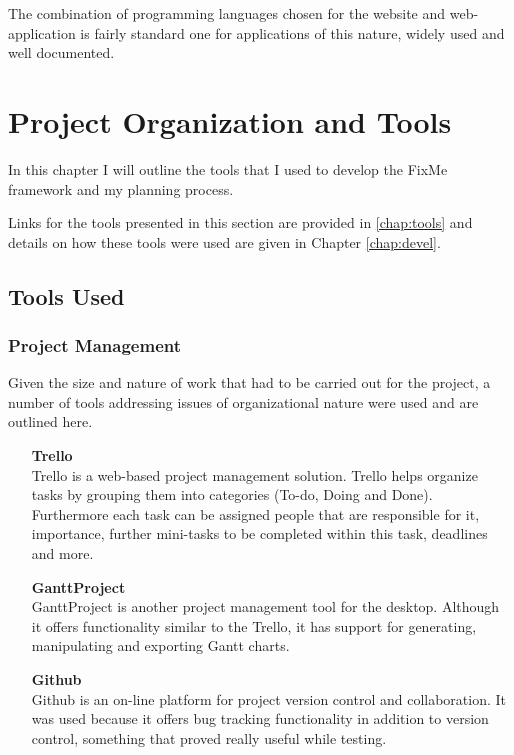 \documentclass[12pt]{ecsproject}     %
\begin{document}
The combination of programming languages chosen for the website and web-application is fairly standard one for applications of this nature, widely used and well documented.\\

\chapter{Project Organization and Tools}
\label{chap:projtools}
In this chapter I will outline the tools that I used to develop the FixMe framework and my planning process.

Links for the tools presented in this section are provided in \ref{chap:tools} and details on how these tools were used are given in Chapter \ref{chap:devel}.

\section{Tools Used}
\subsection{Project Management}
\label{sub:pm}
Given the size and nature of work that had to be carried out for the project, a number of tools addressing issues of organizational nature were used and are outlined here.

\begin{itemize}
\item[\textbf{Trello}] \hfill \\
Trello is a web-based project management solution. Trello helps organize tasks by grouping them into categories (To-do, Doing and Done). Furthermore each task can be assigned people that are responsible for it, importance, further mini-tasks to be completed within this task, deadlines and more.
\item[\textbf{GanttProject}]\hfill \\
GanttProject is another project management tool for the desktop. Although it offers functionality similar to the Trello, it has support for generating, manipulating and exporting Gantt charts.
\item[\textbf{Github}]\hfill \\
Github is an on-line platform for project version control and  collaboration. It was used because it offers bug tracking functionality in addition to version control, something that proved really useful while testing.
\end{itemize}
\end{document}
